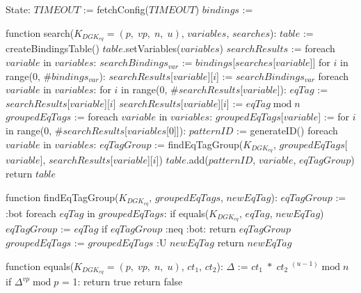 State:
    $TIMEOUT$ := fetchConfig($TIMEOUT$)
    $bindings$ := {}

function search($K_{DGK_{eq}} = (p, \; vp, \; n, \; u)$, $variables$, $searches$):
    $table$ := createBindingsTable()
    $table$.setVariables($variables$)
    $searchResults$ := {}
    foreach $variable$ in $variables$:
        $searchBindings_{var}$ := $bindings$[$searches$[$variable$]]
        for $i$ in range(0, $\#bindings_{var}$):
            $searchResults$[$variable$][$i$] := $searchBindings_{var}$
    foreach $variable$ in $variables$:
        for $i$ in range(0, $\#searchResults$[$variable$]):
            $eqTag$ := $searchResults$[$variable$][$i$]
            $searchResults$[$variable$][$i$] := $eqTag \; \textrm{mod} \; n$
    $groupedEqTags$ := {}
    foreach $variable$ in $variables$:
        $groupedEqTags$[$variable$] := {}
    for $i$ in range(0, $\#searchResults$[$variables$[0]]):
        $patternID$ := generateID()
        foreach $variable$ in $variables$:
            $eqTagGroup$ := findEqTagGroup($K_{DGK_{eq}}$, $groupedEqTags$[$variable$], $searchResults$[$variable$][$i$])
            $table$.add($patternID$, $variable$, $eqTagGroup$)
    return $table$

function findEqTagGroup($K_{DGK_{eq}}$, $groupedEqTags$, $newEqTag$):
    $eqTagGroup$ := :bot
    foreach $eqTag$ in $groupedEqTags$:
        if equals($K_{DGK_{eq}}$, $eqTag$, $newEqTag$)
            $eqTagGroup$ := $eqTag$
    if $eqTagGroup$ :neq :bot:
        return $eqTagGroup$
    $groupedEqTags$ := $groupedEqTags$ :U { $newEqTag$ }
    return $newEqTag$

function equals($K_{DGK_{eq}} = (p, \; vp, \; n, \; u)$, $ct_1$, $ct_2$):
    $\Delta$ := $ct_1 \; * \; ct_2\;^{(u - 1)} \; \textrm{mod} \; n$
    if $\Delta^{vp} \; \textrm{mod} \; p$ = 1:
        return true
    return false